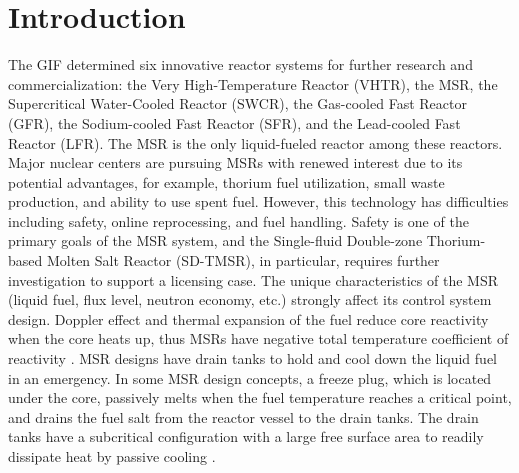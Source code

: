\section{Introduction} \label{Introduction}

The \gls{GIF} \cite{doe2002technology} determined six innovative reactor 
systems for further research and commercialization: the Very High-Temperature Reactor (VHTR), the \gls{MSR}, the 
Supercritical Water-Cooled Reactor (SWCR), the Gas-cooled Fast Reactor (GFR), 
the Sodium-cooled Fast Reactor (SFR), and the Lead-cooled Fast Reactor (LFR). 
The MSR is the only liquid-fueled reactor among these reactors. Major nuclear 
centers are pursuing MSRs with renewed interest \cite{betzler_impacts_2019, 
ashraf2020whole}
due to its potential advantages, for example, thorium fuel utilization, small waste production, and ability to use spent fuel.
However, this technology has difficulties including safety, 
online reprocessing, and fuel handling. Safety is one of the primary goals of
the MSR system, and the Single-fluid Double-zone Thorium-based Molten Salt Reactor (SD-TMSR), in particular, requires further investigation to support a licensing case.
The unique characteristics of the MSR (liquid fuel, flux level, neutron economy, 
etc.) strongly affect its control system design. Doppler effect and thermal expansion of the fuel reduce
core reactivity when the core heats up, thus MSRs have negative total temperature coefficient of reactivity 
\cite{nuttin2005potential}.
MSR designs have drain tanks to 
hold and cool down the liquid fuel in an emergency. In some MSR design concepts, a freeze plug, which 
is located under the core, passively melts when the fuel temperature reaches a 
critical point, and drains the fuel salt from the reactor vessel to the drain 
tanks. The drain tanks have a subcritical
configuration with a large free 
surface area to readily dissipate heat by passive cooling 
\cite{elsheikh2013safety}.

